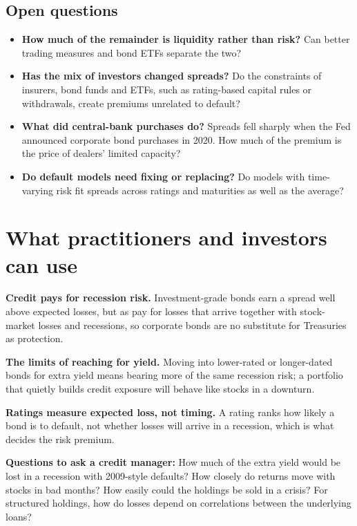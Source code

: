 \subsection{Open questions}
\label{sec:15-open}

\begin{itemize}
  \item \textbf{How much of the remainder is liquidity rather than risk?} Can better trading measures and bond ETFs separate the two?
  \item \textbf{Has the mix of investors changed spreads?} Do the constraints of insurers, bond funds and ETFs, such as rating-based capital rules or withdrawals, create premiums unrelated to default?
  \item \textbf{What did central-bank purchases do?} Spreads fell sharply when the Fed announced corporate bond purchases in 2020. How much of the premium is the price of dealers' limited capacity?
  \item \textbf{Do default models need fixing or replacing?} Do models with time-varying risk fit spreads across ratings and maturities as well as the average?
\end{itemize}

\section{What practitioners and investors can use}
\label{sec:15-investors}

\textbf{Credit pays for recession risk.} Investment-grade bonds earn a spread well above expected losses, but as pay for losses that arrive together with stock-market losses and recessions, so corporate bonds are no substitute for Treasuries as protection.

\textbf{The limits of reaching for yield.} Moving into lower-rated or longer-dated bonds for extra yield means bearing more of the same recession risk; a portfolio that quietly builds credit exposure will behave like stocks in a downturn.

\textbf{Ratings measure expected loss, not timing.} A rating ranks how likely a bond is to default, not whether losses will arrive in a recession, which is what decides the risk premium.

\textbf{Questions to ask a credit manager:} How much of the extra yield would be lost in a recession with 2009-style defaults? How closely do returns move with stocks in bad months? How easily could the holdings be sold in a crisis? For structured holdings, how do losses depend on correlations between the underlying loans?

